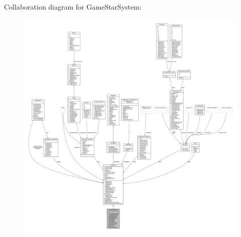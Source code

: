 Collaboration diagram for Game\+Star\+System\+:
\nopagebreak
\begin{figure}[H]
\begin{center}
\leavevmode
\includegraphics[width=350pt]{d9/dba/classGameStarSystem__coll__graph}
\end{center}
\end{figure}
